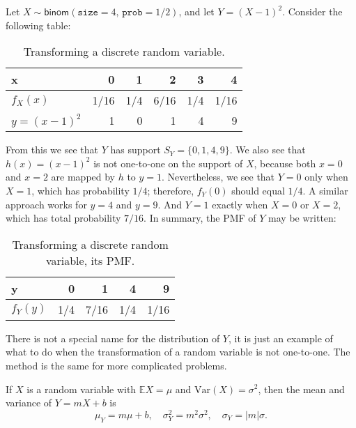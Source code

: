 Let \(X\sim\mathsf{binom}(\mathtt{size}=4,\,\mathtt{prob}=1/2)\), and let \(Y=(X-1)^{2}\). Consider the following table:

\begin{table}[htb]
\caption[Transform discrete random variable]{\label{tab-disc-transf}Transforming a discrete random variable.}
\centering
\begin{tabular}{lrrrrr}
x & 0 & 1 & 2 & 3 & 4\\
\hline
\(f_{X}(x)\) & 1/16 & 1/4 & 6/16 & 1/4 & 1/16\\
\hline
\(y=(x-1)^{2}\) & 1 & 0 & 1 & 4 & 9\\
\end{tabular}
\end{table}

From this we see that \(Y\) has support \(S_{Y}=\{0,1,4,9\}\). We also
see that \(h(x)=(x-1)^{2}\) is not one-to-one on the support of \(X\),
because both \(x=0\) and \(x=2\) are mapped by \(h\) to
\(y=1\). Nevertheless, we see that \(Y=0\) only when \(X=1\), which
has probability \(1/4\); therefore, \(f_{Y}(0)\) should equal
\(1/4\). A similar approach works for \(y=4\) and \(y=9\). And \(Y=1\)
exactly when \(X=0\) or \(X=2\), which has total probability
\(7/16\). In summary, the PMF of \(Y\) may be written:

\begin{table}[htb]
\caption[Transforming discrete random variable: PMF]{\label{tab-disc-transf-pmf}Transforming a discrete random variable, its PMF.}
\centering
\begin{tabular}{lrrrr}
y & 0 & 1 & 4 & 9\\
\hline
\(f_{Y}(y)\) & 1/4 & 7/16 & 1/4 & 1/16\\
\end{tabular}
\end{table}

There is not a special name for the distribution of \(Y\), it is just
an example of what to do when the transformation of a random variable
is not one-to-one. The method is the same for more complicated
problems.


\begin{prop}
If \(X\) is a random variable with \(\mathbb{E} X=\mu\) and \(\mbox{Var}(X)=\sigma^{2}\), then the mean and variance of \(Y=mX+b\) is
\begin{equation}
\mu_{Y}=m\mu+b,\quad \sigma_{Y}^{2}=m^{2}\sigma^{2},\quad \sigma_{Y}=|m|\sigma.
\end{equation}
\end{prop}

